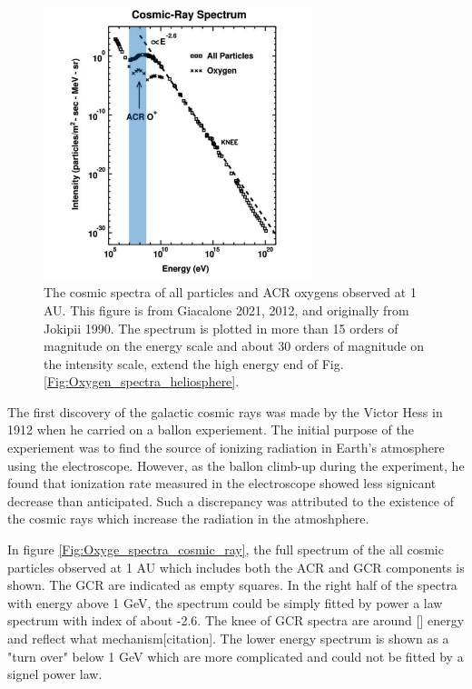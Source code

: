 \begin{figure}
	\centering
	\includegraphics[width = 0.7\textwidth]{images/gcr_spectra_shadow.png}
	
	\caption{The cosmic spectra of all particles and ACR oxygens observed at 1 AU. This figure is from Giacalone 2021, 2012, and originally from Jokipii 1990.
	The spectrum is plotted in more than 15 orders of magnitude on the energy scale and about 30 orders of magnitude on the intensity scale, extend the high energy end of Fig.\ref{Fig:Oxygen_spectra_heliosphere}.}
	\label{Fig:Oxygen_spectra_cosmic_ray}
\end{figure}
The first discovery of the galactic cosmic rays was made by the Victor Hess in 1912 when he carried on a ballon experiement. The initial purpose of the experiement was to find the source of ionizing radiation in Earth's atmosphere using the electroscope. However, as the ballon climb-up during the experiment, he found that ionization rate measured in the electroscope showed less signicant decrease than anticipated. Such a discrepancy was attributed to the existence of the cosmic rays which increase the radiation in the atmoshphere.

In figure \ref{Fig:Oxyge_spectra_cosmic_ray}, the full spectrum of the all cosmic particles observed at 1 AU which includes both the \ac{ACR} and \ac{GCR} components is shown. The \acs{GCR} are indicated as empty squares. In the right half of the spectra with energy above 1 GeV, the spectrum could be simply fitted by power a law spectrum with index of about -2.6. The knee of GCR spectra are around [] energy and reflect what mechanism[citation]. The lower energy spectrum is shown as a "turn over" below 1 GeV which are more complicated and could not be fitted by a signel power law. 

